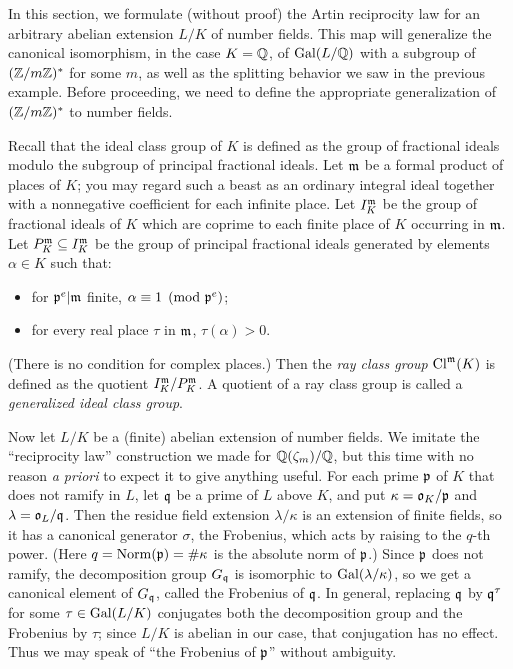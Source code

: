 In this section, we formulate (without proof) the Artin reciprocity law
for an arbitrary abelian extension $L/K$ of number fields. This map will
generalize the canonical isomorphism, in the case $K = \mathbb{Q}$, of
$\operatorname{Gal}(L/\mathbb{Q})$ with a subgroup of $(\mathbb{Z}/m\mathbb{Z})^*$ for some $m$,
as well as the splitting behavior we saw in the previous example. Before
proceeding, we need to define the appropriate generalization of
$(\mathbb{Z}/m\mathbb{Z})^*$ to number fields.

Recall that the ideal class group of $K$ is defined as the group of
fractional ideals modulo the subgroup of principal
fractional ideals. Let $\mathfrak{m}$ be a formal product of places of $K$;
you may regard such a beast as an ordinary integral ideal together
with a nonnegative coefficient for each infinite place. Let $I_K^{\mathfrak{m}}$
be the group of fractional ideals of $K$ which are coprime to each finite
place of $K$ occurring in $\mathfrak{m}$. Let $P_K^{\mathfrak{m}} \subseteq I_K^{\mathfrak{m}}$
be the group of principal fractional ideals generated by elements
$\alpha \in K$ such that:
\begin{itemize}
\item for $\mathfrak{p}^e | \mathfrak{m}$ finite, $\alpha \equiv 1 \pmod{\mathfrak{p}^e}$;
\item for every real place $\tau$ in $\mathfrak{m}$, $\tau(\alpha) > 0$.
\end{itemize}
(There is no condition for complex places.) Then the \emph{ray class group}
$\operatorname{Cl}^{\mathfrak{m}}(K)$ is defined as the quotient $I_K^{\mathfrak{m}} /
P_K^{\mathfrak{m}}$. A quotient of
a ray class group is called a \emph{generalized ideal class group}.


Now let $L/K$ be a (finite) abelian extension of number fields. We imitate
the ``reciprocity law'' construction we made for $\mathbb{Q}(\zeta_m)/\mathbb{Q}$, but
this time with no reason \emph{a priori} to expect it to give anything useful.
For each prime $\mathfrak{p}$ of $K$ that does not ramify in $L$, let $\mathfrak{q}$ be
a prime of $L$ above $K$, and put $\kappa = \mathfrak{o}_K/\mathfrak{p}$ and
$\lambda = \mathfrak{o}_L/\mathfrak{q}$.
Then the residue field extension $\lambda/\kappa$
is an extension of finite fields, so it has a canonical
generator $\sigma$, the Frobenius, which acts by raising to the $q$-th power.
(Here $q = \operatorname{Norm}(\mathfrak{p}) = \#\kappa$ is the absolute norm of $\mathfrak{p}$.)
Since $\mathfrak{p}$ does not ramify, the decomposition group $G_{\mathfrak{q}}$ is
isomorphic to $\operatorname{Gal}(\lambda/\kappa)$, so we get a canonical element of
$G_{\mathfrak{q}}$, called the Frobenius of $\mathfrak{q}$. In general, replacing
$\mathfrak{q}$ by $\mathfrak{q}^\tau$ for some $\tau \in \operatorname{Gal}(L/K)$ conjugates both the
decomposition group and the Frobenius by $\tau$; since $L/K$ is abelian in
our case, that conjugation has no effect. Thus we may speak of ``the
Frobenius of $\mathfrak{p}$'' without ambiguity.

